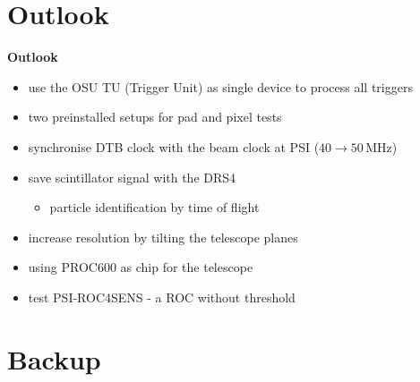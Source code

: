 \documentclass[9pt]{beamer}
\begin{document}
\section{Outlook}
\begin{frame}
	\begin{alertblock}{
		\begin{center}
			\Large{\textbf{Outlook}}
		\end{center}}
	\end{alertblock}
\end{frame}
\begin{frame}
	\begin{itemize}
		\vfill\item use the OSU TU (Trigger Unit) as single device to process all triggers
		\vfill\item two preinstalled setups for pad and pixel tests
		\vfill\item synchronise DTB clock with the beam clock at PSI ($40\rightarrow50$\,MHz)
		\vfill\item save scintillator signal with the DRS4
		\begin{itemize}
			\item particle identification by time of flight
		\end{itemize}
		\vfill\item increase resolution by tilting the telescope planes
		\vfill\item using PROC600 as chip for the telescope
		\vfill\item test PSI-ROC4SENS - a ROC without threshold
	\end{itemize}
\end{frame}
\section*{Backup}
\end{document}
